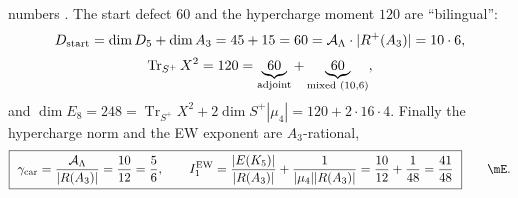 numbers \mE. The start defect
$60$ and the hypercharge moment $120$ are ``bilingual'':
\begin{equation}
\begin{gathered}
  D_{\mathrm{start}}=\dim D_5+\dim A_3=45+15=60=\mathcal A_\Lambda\cdot|R^+(A_3)|=10\cdot6,\\[2pt]
  \operatorname{Tr}_{S^+}X^2=120=\underbrace{60}_{\text{adjoint}}+\underbrace{60}_{\text{mixed }(10,6)} ,
\end{gathered}
\end{equation}
and $\dim E_8=248=\operatorname{Tr}_{S^+}X^2+2\dim S^+|\mu_4|=120+2\cdot16\cdot4$. Finally the
hypercharge norm and the EW exponent are $A_3$-rational,
\begin{equation}
  \boxed{\ \gamma_{\mathrm{car}}=\frac{\AL}{|R(A_3)|}=\frac{10}{12}=\frac56,\qquad
  I_1^{\mathrm{EW}}=\frac{|E(K_5)|}{|R(A_3)|}+\frac{1}{|\mu_4||R(A_3)|}=\frac{10}{12}+\frac1{48}=\frac{41}{48}\ }\qquad\mE .
\end{equation}

